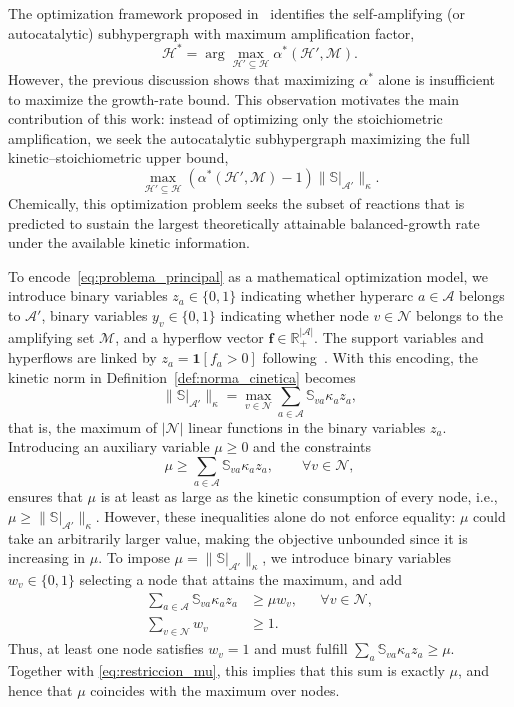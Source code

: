 \documentclass[a4paper,11pt,reqno]{amsart}
\begin{document}
The optimization framework proposed in~\cite{gonzalez2024maf} identifies the
self-amplifying (or autocatalytic) subhypergraph with maximum amplification factor,
$$
\mathcal{H}^*
=
\arg\max_{\mathcal{H}'\subseteq\mathcal{H}}
\alpha^*(\mathcal{H}',\mathcal{M}).
$$
However, the previous discussion shows that maximizing $\alpha^*$ alone is
insufficient to maximize the growth-rate bound. This observation motivates the
main contribution of this work: instead of optimizing only the stoichiometric
amplification, we seek the autocatalytic subhypergraph maximizing the full
kinetic--stoichiometric upper bound,
\begin{equation}
\max_{\mathcal{H}'\subseteq\mathcal{H}}
\left(\alpha^*(\mathcal{H}',\mathcal{M})-1\right)
\|\mathbb{S}|_{\mathcal{A}'}\|_{\kappa}.
\label{eq:problema_principal}
\end{equation}
Chemically, this optimization problem seeks the subset of reactions that is
predicted to sustain the largest theoretically attainable balanced-growth
rate under the available kinetic information.

To encode~\eqref{eq:problema_principal} as a mathematical optimization model, we introduce binary variables $z_a\in\{0,1\}$ indicating whether hyperarc $a\in\mathcal A$ belongs to $\mathcal A'$, binary variables $y_v\in\{0,1\}$ indicating whether node $v\in\mathcal N$ belongs to the amplifying set $\mathcal M$, and a hyperflow vector $\mathbf f\in\mathbb R_+^{|\mathcal A|}$. The support variables and hyperflows are linked by $z_a=\mathbf{1}[f_a>0]$ following~\citep{gonzalez2024maf}. With this encoding, the kinetic norm in Definition~\ref{def:norma_cinetica} becomes
$$
  \|\mathbb{S}|_{\mathcal A'}\|_{\kappa}
  =
  \max_{v\in\mathcal N}
  \sum_{a\in\mathcal A}\mathbb{S}_{va}\kappa_a z_a,
$$
that is, the maximum of $|\mathcal N|$ linear functions in the binary variables
$z_a$. Introducing an auxiliary variable $\mu\geq0$ and the constraints
\begin{equation}
  \mu \geq
  \sum_{a\in\mathcal A}\mathbb{S}_{va}\kappa_a z_a,
  \qquad \forall v\in\mathcal N,
  \label{eq:restriccion_mu}
\end{equation}
ensures that $\mu$ is at least as large as the kinetic consumption of every
node, i.e., $\mu\geq
\|\mathbb{S}|_{\mathcal A'}\|_{\kappa}$. However, these
inequalities alone do not enforce equality: $\mu$ could take an arbitrarily
larger value, making the objective unbounded since it is increasing in $\mu$.
To impose $\mu=\|\mathbb{S}|_{\mathcal A'}\|_{\kappa}$, we introduce
binary variables $w_v\in\{0,1\}$ selecting a node that attains the maximum, and
add
\begin{align}
  \sum_{a\in\mathcal A}\mathbb{S}_{va}\kappa_a z_a
  &\geq \mu w_v,
  && \forall v\in\mathcal N,
  \nonumber\\
  \sum_{v\in\mathcal N}w_v &\geq 1.
  \label{eq:mu_lower}
\end{align}
Thus, at least one node satisfies $w_v=1$ and must fulfill
$\sum_a\mathbb{S}_{va}\kappa_a z_a\geq\mu$. Together with
\eqref{eq:restriccion_mu}, this implies that this sum is exactly $\mu$, and
hence that $\mu$ coincides with the maximum over nodes.
\end{document}

